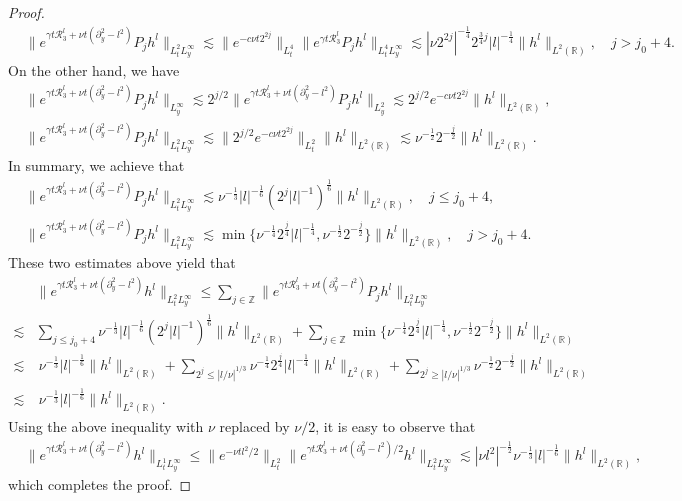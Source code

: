 \documentclass[11pt,reqno]{article}
\numberwithin{equation}{section}
\newcommand\R{{\mathbb R}}
\newcommand\Z{{\mathbb Z}}
\let\f=\frac
\begin{document}
\begin{appendices}
\begin{proof}
\begin{align*}
        &\|e^{\gamma t \mathcal{R}_3^l+\nu t(\partial_y^2-l^2)}P_jh^l\|_{L_t^2L_y^{\infty}}\lesssim\|e^{-c\nu t2^{2j}}\|_{L_t^4}\|e^{\gamma t \mathcal{R}_3^l}P_jh^l\|_{L_t^4L_y^{\infty}}\lesssim|\nu 2^{2j}|^{-\f14}2^{\f34j}|l|^{-\f14}\|h^l\|_{L^{2}(\R)},\quad j >j_0+4.
    \end{align*}
    On the other hand, we have
    \begin{align*}
        &\|e^{\gamma t \mathcal{R}_3^l+\nu t(\partial_y^2-l^2)}P_jh^l\|_{L_y^{\infty}}
        \lesssim
        2^{j/2}\|e^{\gamma t \mathcal{R}_3^l+\nu t(\partial_y^2-l^2)}P_jh^l\|_{L_y^{2}}
        \lesssim 
        2^{j/2}e^{-c\nu t2^{2j}}\|h^l\|_{L^{2}(\R)},\\
        &\|e^{\gamma t \mathcal{R}_3^l+\nu t(\partial_y^2-l^2)}P_jh^l\|_{L_t^2L_y^{\infty}}
        \lesssim
        \|2^{j/2}e^{-c\nu t2^{2j}}\|_{L_t^2}\|h^l\|_{L^{2}(\R)}
        \lesssim
        \nu^{-\f12}2^{-\f j2}\|h^l\|_{L^{2}(\R)}.
    \end{align*}
    In summary, we achieve that
    \begin{align*}
        &\|e^{\gamma t \mathcal{R}_3^l+\nu t(\partial_y^2-l^2)}P_jh^l\|_{L_t^2L_y^{\infty}}
        \lesssim
        \nu^{-\f13} |l|^{-\f16}(2^j|l|^{-1})^{\f16}\|h^l\|_{L^{2}(\R)},\quad j\leq j_0+4,\\
        &\|e^{\gamma t \mathcal{R}_3^l+\nu t(\partial_y^2-l^2)}P_jh^l\|_{L_t^2L_y^{\infty}}
        \lesssim
        \min\{\nu^{-\f14}
        2^{\f j4}|l|^{-\f14},\nu^{-\f12}2^{-\f j2}\}\|h^l\|_{L^{2}(\R)},\quad j >j_0+4.
    \end{align*}
    These two estimates above yield that
    \begin{align*}
        &\|e^{\gamma t \mathcal{R}_3^l+\nu t(\partial_y^2-l^2)}h^l\|_{L_t^2L_y^{\infty}}\leq  \sum_{j\in\Z}\|e^{\gamma t \mathcal{R}_3^l+\nu t(\partial_y^2-l^2)}P_jh^l\|_{L_t^2L_y^{\infty}}\\ 
        \lesssim& \sum_{j\leq j_0+4}\nu^{-\f13} |l|^{-\f16}(2^j|l|^{-1})^{\f16}\|h^l\|_{L^{2}(\R)}
        +\sum_{j\in\Z}\min\{\nu^{-\f14}
        2^{\f j4}|l|^{-\f14},\nu^{-\f12}2^{-\f j2}\}\|h^l\|_{L^{2}(\R)}\\ 
        \lesssim&~ \nu^{-\f13} |l|^{-\f16}\|h^l\|_{L^{2}(\R)}
        +\sum_{2^j\leq|l/\nu|^{1/3}}\nu^{-\f14}
        2^{\f j4}|l|^{-\f14}\|h^l\|_{L^{2}(\R)}
        +\sum_{2^j\geq|l/\nu|^{1/3}}
      \nu^{-\f12}2^{-\f j2}\|h^l\|_{L^{2}(\R)}\\ 
      \lesssim& ~\nu^{-\f13} |l|^{-\f16}\|h^l\|_{L^{2}(\R)}.
    \end{align*}
    Using the above inequality with $\nu$ replaced by $\nu/2$, it is easy to observe that
    \begin{align*}
        &\|e^{\gamma t \mathcal{R}_3^l+\nu t(\partial_y^2-l^2)}h^l\|_{L_t^1L_y^{\infty}}
        \leq 
        \|e^{-\nu t l^2/2}\|_{L_t^2}\|e^{\gamma t \mathcal{R}_3^l+\nu t(\partial_y^2-l^2)/2}h^l\|_{L_t^2L_y^{\infty}} 
        \lesssim
        |\nu l^2|^{-\f12}\nu^{-\f13} |l|^{-\f16}\|h^l\|_{L^{2}(\R)},
    \end{align*} 
 which completes the proof.
 \end{proof}


\end{appendices}
\end{document}
